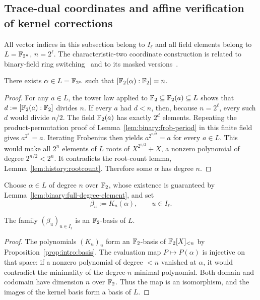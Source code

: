 \subsection{Trace-dual coordinates and affine verification of kernel corrections}\label{sec:binary:coordinates}
All vector indices in this subsection belong to $I_\ell$ and all
field elements belong to $L=\mathbb{F}_{2^n}$, $n=2^\ell$.
The characteristic-two coordinate construction is related
to binary-field ring switching~\cite{DiamondPosen2024}
and to its masked versions~\cite{Kochergin2026,FrigoShelat2026}.

\begin{lemma}\label{lem:binary:full-degree-element}
There exists $\alpha\in L=\mathbb{F}_{2^n}$ such that
$[\mathbb{F}_2(\alpha):\mathbb{F}_2]=n$.
\end{lemma}
\begin{proof}
For any $a\in L$, the tower law applied to
$\mathbb{F}_2\subseteq\mathbb{F}_2(a)\subseteq L$
shows that $d:=[\mathbb{F}_2(a):\mathbb{F}_2]$ divides $n$.
If every $a$ had $d<n$, then, because $n=2^\ell$,
every such $d$ would divide $n/2$.
The field $\mathbb{F}_2(a)$ has exactly $2^d$ elements.
Repeating the product-permutation proof of
Lemma~\ref{lem:binary:frob-period} in this
finite field gives $a^{2^d}=a$.
Iterating Frobenius then yields
$a^{2^{n/2}}=a$ for every $a\in L$.
This would make all $2^n$ elements of $L$ roots of
$X^{2^{n/2}}+X$, a nonzero polynomial of degree
$2^{n/2}<2^n$. It contradicts the root-count lemma,
Lemma~\ref{lem:history:rootcount}.
Therefore some $\alpha$ has degree $n$.
\end{proof}

\begin{definition}\label{def:binary:eval-basis}
Choose $\alpha\in L$ of degree $n$ over $\mathbb{F}_2$,
whose existence is guaranteed by
Lemma~\ref{lem:binary:full-degree-element}, and set
\[
 \beta_u:=K_u(\alpha),\qquad u\in I_\ell.
\]
\end{definition}

\begin{lemma}\label{lem:binary:eval-basis}
The family $(\beta_u)_{u\in I_\ell}$ is an $\mathbb{F}_2$-basis of $L$.
\end{lemma}
\begin{proof}
The polynomials $(K_u)_u$ form an $\mathbb{F}_2$-basis of
$\mathbb{F}_2[X]_{<n}$ by Proposition~\ref{prop:intro:basis}.
The evaluation map $P\mapsto P(\alpha)$ is injective on
that space: if a nonzero polynomial of degree $<n$
vanished at $\alpha$, it would contradict the minimality
of the degree-$n$ minimal polynomial.
Both domain and codomain have dimension $n$ over $\mathbb{F}_2$.
Thus the map is an isomorphism, and the images of the
kernel basis form a basis of $L$.
\end{proof}

